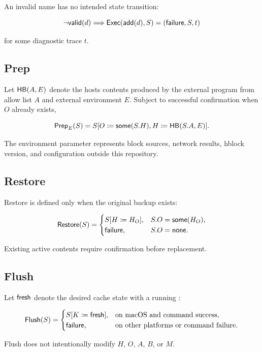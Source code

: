 An invalid name has no intended state transition:

\[
  \neg\mathsf{valid}(d)\Longrightarrow
  \mathsf{Exec}(\mathsf{add}(d),S)=(\mathsf{failure},S,t)
\]

for some diagnostic trace $t$.

\subsection{Prep}

Let $\mathsf{HB}(A,E)$ denote the hosts contents produced by the external
 program from allow list $A$ and external environment $E$.
Subject to successful confirmation when $O$ already exists,

\[
  \mathsf{Prep}_E(S)=S[O\coloneqq\mathsf{some}(S.H),
                 H\coloneqq\mathsf{HB}(S.A,E)].
\]

The environment parameter represents block sources, network results, hblock
version, and configuration outside this repository.

\subsection{Restore}

Restore is defined only when the original backup exists:

\[
\mathsf{Restore}(S)=
  \begin{cases}
    S[H\coloneqq H_O], & S.O=\mathsf{some}(H_O),\\
    \mathsf{failure}, & S.O=\mathsf{none}.
  \end{cases}
\]

Existing active contents require confirmation before replacement.

\subsection{Flush}

Let $\mathsf{fresh}$ denote the desired cache state with a running
:

\[
\mathsf{Flush}(S)=
  \begin{cases}
    S[K\coloneqq\mathsf{fresh}], & \text{on macOS and command success},\\
    \mathsf{failure}, & \text{on other platforms or command failure}.
  \end{cases}
\]

Flush does not intentionally modify $H$, $O$, $A$, $B$, or $M$.
